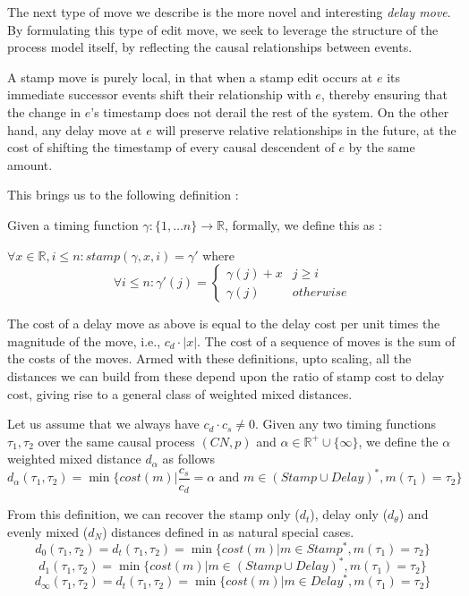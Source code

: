 \documentclass[runningheads]{llncs}
\newcounter{cases}
\begin{document}
	The next type of move we describe is the more novel and interesting \textit{delay move}. 
	By formulating this type of edit move, we seek to leverage the structure of the process model itself, by reflecting the causal relationships between events. 
	
	A stamp move is purely local, in that when a stamp edit occurs at $e$ its immediate successor events shift their relationship with $e$, thereby ensuring that the change in $e$'s timestamp does not derail the rest of the system. 
	On the other hand, any delay move at $e$ will preserve relative relationships in the future, at the cost of shifting the timestamp of every causal descendent of $e$ by the same amount. 
	
	This brings us to the following definition : 
	
	\begin{definition}
		Given a timing function $\gamma : \{1, \dots n\} \to \mathbb{R}$, formally, we define this as : 
		
		$\forall x \in \mathbb{R}, i \leq n : stamp(\gamma, x, i) =\gamma' $ where
		$$\forall i \leq n : \gamma'(j)  = \begin{cases}
			\gamma(j) + x & j \geq  i \\
			\gamma(j)& otherwise
		\end{cases}$$
		
	\end{definition}
	
	The cost of a delay move as above is equal to the delay cost per unit times the magnitude of the move, i.e., $c_d \cdot |x|$. 
The cost of a sequence of moves is the sum of the costs of the moves. Armed with these definitions, upto scaling, all the distances we can build from these depend upon the ratio of stamp cost to delay cost, giving rise to a general class of weighted mixed distances. 
	\begin{definition}
		Let us assume that we always have $c_d \cdot c_s \neq 0$. Given any two timing functions $\tau_1, \tau_2$ over the same causal process $(CN, p)$ and $\alpha \in \mathbb{R}^+ \cup \{\infty\}$, we define the $\alpha$ weighted mixed distance $d_{\alpha}$ as follows 
		\small	$$d_{\alpha}(\tau_1, \tau_2) = \min \{cost(m) | \frac{c_s}{c_d} = \alpha \textrm{ and } {m \in (Stamp \cup Delay)^*}, {m(\tau_1) = \tau_2}\}$$
		
	\end{definition}
	
	From this definition, we can recover the stamp only ($d_t$), delay only ($d_{\theta}$) and evenly mixed ($d_N$) distances defined in \cite{CR22} as natural special cases. 
		$$d_0(\tau_1, \tau_2) = d_t(\tau_1, \tau_2) = \min \{cost(m) | {m \in Stamp^*}, {m(\tau_1) = \tau_2}\}$$
		$$d_1(\tau_1, \tau_2) = \min \{cost(m) | {m \in (Stamp \cup Delay)^*}, {m(\tau_1) = \tau_2}\}$$
		$$d_{\infty}(\tau_1, \tau_2) = d_t(\tau_1, \tau_2) = \min \{cost(m) | {m \in Delay^*}, {m(\tau_1) = \tau_2}\}$$
\end{document}
